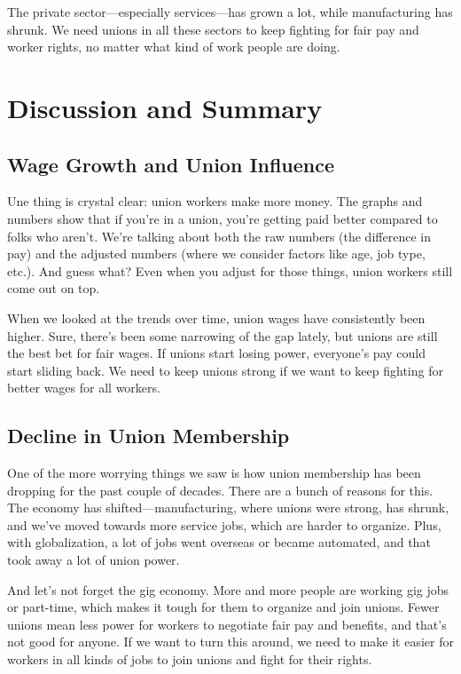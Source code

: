 \documentclass[
]{book}
\theoremstyle{definition}
\theoremstyle{definition}
\theoremstyle{definition}
\theoremstyle{definition}
\theoremstyle{remark}
\begin{document}
The private sector---especially services---has grown a lot, while manufacturing has shrunk. We need unions in all these sectors to keep fighting for fair pay and worker rights, no matter what kind of work people are doing.

\section{Discussion and Summary}\label{discussion-and-summary}

\subsection{Wage Growth and Union Influence}\label{wage-growth-and-union-influence}

Une thing is crystal clear: union workers make more money. The graphs and numbers show that if you're in a union, you're getting paid better compared to folks who aren't. We're talking about both the raw numbers (the difference in pay) and the adjusted numbers (where we consider factors like age, job type, etc.). And guess what? Even when you adjust for those things, union workers still come out on top.

When we looked at the trends over time, union wages have consistently been higher. Sure, there's been some narrowing of the gap lately, but unions are still the best bet for fair wages. If unions start losing power, everyone's pay could start sliding back. We need to keep unions strong if we want to keep fighting for better wages for all workers.

\subsection{Decline in Union Membership}\label{decline-in-union-membership}

One of the more worrying things we saw is how union membership has been dropping for the past couple of decades. There are a bunch of reasons for this. The economy has shifted---manufacturing, where unions were strong, has shrunk, and we've moved towards more service jobs, which are harder to organize. Plus, with globalization, a lot of jobs went overseas or became automated, and that took away a lot of union power.

And let's not forget the gig economy. More and more people are working gig jobs or part-time, which makes it tough for them to organize and join unions. Fewer unions mean less power for workers to negotiate fair pay and benefits, and that's not good for anyone. If we want to turn this around, we need to make it easier for workers in all kinds of jobs to join unions and fight for their rights.
\end{document}
